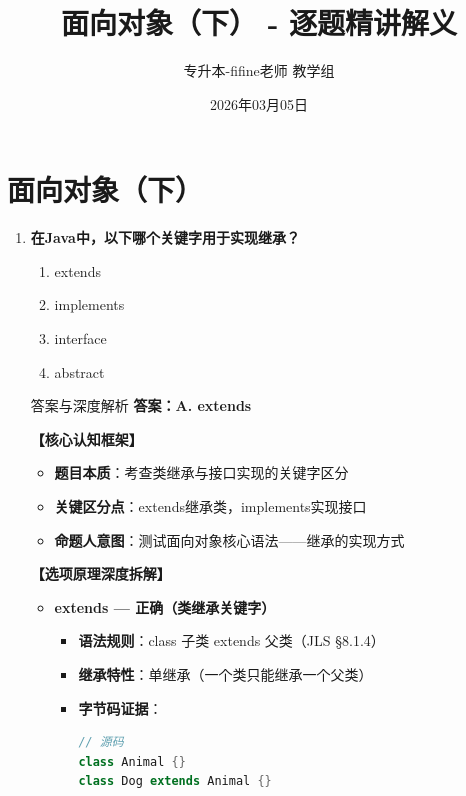 \documentclass[12pt, a4paper]{ctexart}
\title{\textcolor{myblue}{\textbf{面向对象（下） - 逐题精讲解义}}}
\author{专升本-fifine老师 教学组}
\date{2026年03月05日}
\begin{document}
\maketitle
\thispagestyle{empty}
\newpage

\section{面向对象（下）}

\begin{enumerate}[label=\textbf{\arabic*.}]

	\item \textbf{在Java中，以下哪个关键字用于实现继承？}
	      \begin{enumerate}[label=\Alph*.]
		      \item extends
		      \item implements
		      \item interface
		      \item abstract
	      \end{enumerate}

	      \begin{bluebox}{答案与深度解析}
		      \textbf{答案：A. extends}

		      \textbf{【核心认知框架】}
		      \begin{itemize}[label={}, leftmargin=*, nosep]
			      \item \textbf{题目本质}：考查类继承与接口实现的关键字区分
			      \item \textbf{关键区分点}：extends继承类，implements实现接口
			      \item \textbf{命题人意图}：测试面向对象核心语法——继承的实现方式
		      \end{itemize}

		      \textbf{【选项原理深度拆解】}

		      \begin{itemize}[leftmargin=*, nosep, label={}]
			      \item[A] \textbf{extends — 正确（类继承关键字）}
			            \begin{itemize}[label={}, leftmargin=*, nosep]
				            \item \textbf{语法规则}：class 子类 extends 父类（JLS §8.1.4）
				            \item \textbf{继承特性}：单继承（一个类只能继承一个父类）
				            \item \textbf{字节码证据}：
				                  \begin{lstlisting}[language=Java]
// 源码
class Animal {}
class Dog extends Animal {}


\end{lstlisting}
\end{itemize}
\end{itemize}
\end{bluebox}
\end{enumerate}
\end{document}

